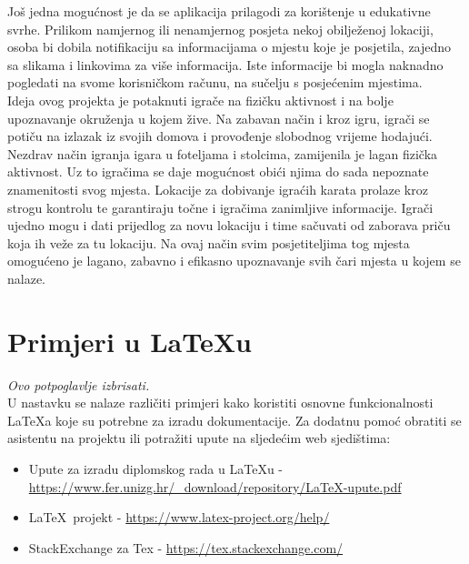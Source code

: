 		\textnormal{Još jedna mogućnost je da se aplikacija prilagodi za korištenje u edukativne svrhe. Prilikom namjernog ili nenamjernog posjeta nekoj obilježenoj lokaciji, osoba bi dobila notifikaciju sa informacijama o mjestu koje je posjetila, zajedno sa slikama i linkovima za više informacija. Iste informacije bi mogla naknadno pogledati na svome korisničkom računu, na sučelju s posjećenim mjestima.}\\
		
		\textnormal{Ideja ovog projekta je potaknuti igrače na fizičku aktivnost i na bolje upoznavanje okruženja u kojem žive. Na zabavan način i kroz igru, igrači se potiču na izlazak iz svojih domova i provođenje slobodnog vrijeme hodajući. Nezdrav način igranja igara u foteljama i stolcima, zamijenila je lagan fizička aktivnost. Uz to igračima se daje mogućnost obići njima do sada nepoznate znamenitosti svog mjesta. Lokacije za dobivanje igraćih karata prolaze kroz strogu kontrolu te garantiraju točne i igračima zanimljive informacije. Igrači ujedno mogu i dati prijedlog za novu lokaciju i time sačuvati od zaborava priču koja ih veže za tu lokaciju. Na ovaj način svim posjetiteljima tog mjesta omogućeno je lagano, zabavno i efikasno upoznavanje svih čari mjesta u kojem se nalaze.}\\
		
		\eject
		
		\section{Primjeri u \LaTeX u}
		
		\textit{Ovo potpoglavlje izbrisati.}\\

		U nastavku se nalaze različiti primjeri kako koristiti osnovne funkcionalnosti \LaTeX a koje su potrebne za izradu dokumentacije. Za dodatnu pomoć obratiti se asistentu na projektu ili potražiti upute na sljedećim web sjedištima:
		\begin{itemize}
			\item Upute za izradu diplomskog rada u \LaTeX u - \url{https://www.fer.unizg.hr/_download/repository/LaTeX-upute.pdf}
			\item \LaTeX\ projekt - \url{https://www.latex-project.org/help/}
			\item StackExchange za Tex - \url{https://tex.stackexchange.com/}\\
		
		\end{itemize} 	


